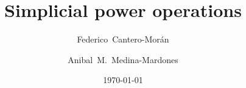 \documentclass{amsart}
\title{Simplicial power operations}
\author[Cantero-Mor\'an]{Federico~Cantero-Mor\'an}
\author[Medina-Mardones]{Anibal~M.~Medina-Mardones}
\date{\today}
\begin{document}
	
	\maketitle
	
	
	
	
	
	
	
	
	
	
	
	
	
	\sloppy
	\printbibliography
	\newpage
	\todos
\end{document}
